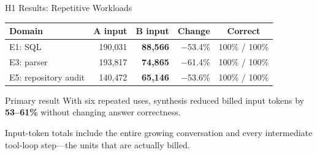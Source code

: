 \documentclass[aspectratio=169,11pt]{beamer}
\begin{document}
\begin{frame}{H1 Results: Repetitive Workloads}
  \centering
  \footnotesize
  \renewcommand{\arraystretch}{1.22}
  \begin{tabular}{lrrrc}
    \toprule
    \textbf{Domain} & \textbf{A input} & \textbf{B input} & \textbf{Change} & \textbf{Correct} \\
    \midrule
    E1: SQL & 190{,}031 & \textbf{88{,}566} & $-$53.4\% & 100\% / 100\% \\
    E3: parser & 193{,}817 & \textbf{74{,}865} & $-$61.4\% & 100\% / 100\% \\
    E5: repository audit & 140{,}472 & \textbf{65{,}146} & $-$53.6\% & 100\% / 100\% \\
    \bottomrule
  \end{tabular}
  \vspace{0.35cm}
  \begin{exampleblock}{Primary result}
    With six repeated uses, synthesis reduced billed input tokens by
    \textbf{53--61\%} without changing answer correctness.
  \end{exampleblock}
  \vspace{0.15cm}
  \footnotesize
  Input-token totals include the entire growing conversation and every
  intermediate tool-loop step---the units that are actually billed.
\end{frame}
\end{document}
